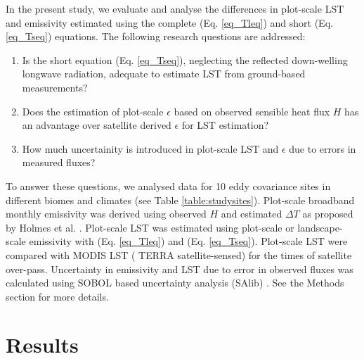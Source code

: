\documentclass[fleqn,10pt]{wlscirep}
\begin{document}
In the present study, we evaluate and analyse the differences in plot-scale LST and emissivity estimated using the complete (Eq. \ref{eq_Tleq}) and short (Eq. \ref{eq_Tseq}) equations. 
The following research questions are addressed:
\begin{enumerate}
	\item Is the short equation (Eq. \ref{eq_Tseq}), neglecting the reflected down-welling longwave radiation, adequate to estimate LST from ground-based measurements?
	\item Does the estimation of plot-scale $\epsilon$ based on observed sensible heat flux $H$ has an advantage over satellite derived $\epsilon$ for LST estimation?
    \item How much uncertainity is introduced in plot-scale LST and $\epsilon$ due to errors in measured fluxes?
    
\end{enumerate}    
To answer these questions, we analysed data for 10 eddy covariance sites in different biomes and climates (see Table \ref{table:studysites}).
Plot-scale broadband monthly emissivity was derived using observed $H$ and estimated $\Delta T$ as proposed by Holmes et al. \cite{holmes_land_2009}.  Plot-scale LST was estimated using plot-scale or landscape-scale emissivity with (Eq. \ref{eq_Tleq}) and (Eq. \ref{eq_Tseq}). Plot-scale LST were compared with MODIS LST ( TERRA satellite-sensed) for the times of satellite over-pass. Uncertainty in emissivity and LST due to error in observed fluxes was calculated using SOBOL based uncertainty analysis (SAlib) \cite{rosolem2012fully}. %
See the Methods section for more details.

\section{Results}

\end{document}
